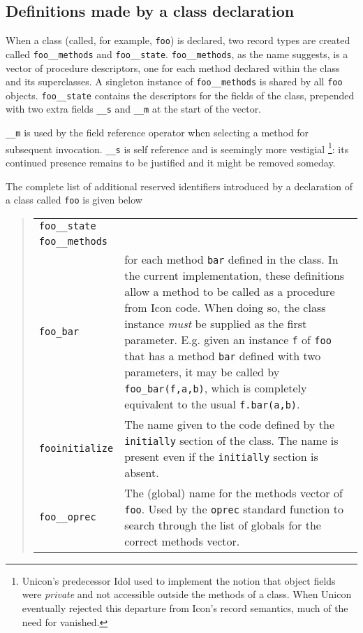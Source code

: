 \subsection{Definitions made by a class declaration}
When a class (called, for example, \texttt{foo}) is declared, two record
types are created called \texttt{foo\_\_methods} and
\texttt{foo\_\_state}. \texttt{foo\_\_methods}, as the name suggests, is a
vector of procedure descriptors, one for each method declared within the
class and its superclasses.  A singleton instance of \texttt{foo\_\_methods}
is shared by all \texttt{foo} objects. \texttt{foo\_\_state} contains the
descriptors for the fields of the class, prepended with two extra fields
\texttt{\_\_s} and \texttt{\_\_m} at the start of the vector.

\texttt{\_\_m} is used by the field reference operator when selecting a
method for subsequent invocation. \texttt{\_\_s} is self reference and is
seemingly more vestigial%
%
\footnote{Unicon's predecessor Idol used  to implement
the notion that object fields were {\em private} and not accessible outside
the methods of a class. When Unicon eventually rejected this departure from
Icon's record semantics, much of the need for  vanished.
}:
its continued presence remains to be justified and it might be removed
someday.

The complete list of additional reserved identifiers introduced by a
declaration of a class called \texttt{foo} is given below
\begin{quote}
  \begin{tabular}{lp{5in}}
    \texttt{foo\_\_state} & \\
    \texttt{foo\_\_methods} & \\

    \texttt{foo\_bar} & for each method \texttt{bar} defined in the class.
    In the current implementation, these definitions allow a method to be
    called as a procedure from Icon code. When doing so, the class instance
    {\em must} be supplied as the first parameter.  E.g. given an instance
    \texttt{f} of \texttt{foo} that has a method \texttt{bar} defined with
    two parameters, it may be called by \texttt{foo\_bar(f,a,b)}, which is
    completely equivalent to the usual \texttt{f.bar(a,b)}.\\

    \texttt{fooinitialize} & The name given to the code defined by the
    \texttt{initially} section of the class.  The name is present even if
    the \texttt{initially} section is absent.\\

    \texttt{foo\_\_oprec} & The (global) name for the methods vector of
    \texttt{foo}. Used by the \texttt{oprec} standard function to search
    through the list of globals for the correct methods vector.\\

   
  \end{tabular}
\end{quote}

